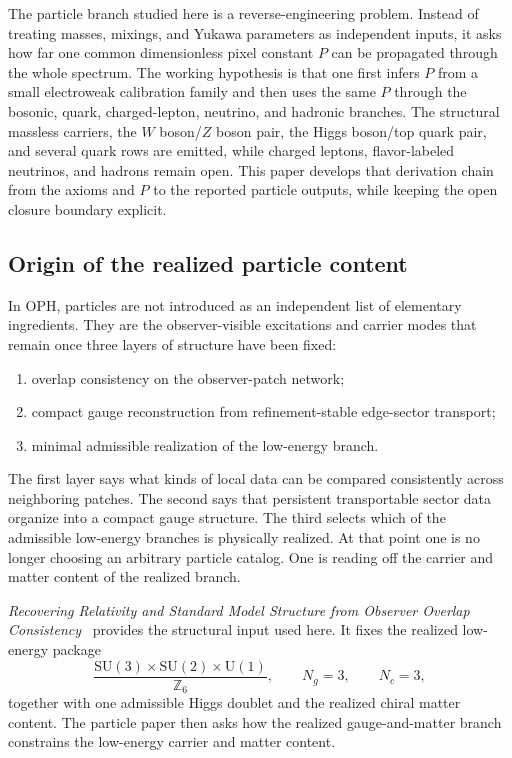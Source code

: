 \documentclass[11pt]{article}
\newcommand{\SU}{\mathrm{SU}}
\newcommand{\U}{\mathrm{U}}
\begin{document}
The particle branch studied here is a reverse-engineering problem. Instead of treating masses,
mixings, and Yukawa parameters as independent inputs, it asks how far one common dimensionless
pixel constant \(P\) can be propagated through the whole spectrum. The working hypothesis is that
one first infers \(P\) from a small electroweak calibration family and then uses the same \(P\)
through the bosonic, quark, charged-lepton, neutrino, and hadronic branches. The structural
massless carriers, the \(W\) boson/\(Z\) boson pair, the Higgs boson/top quark pair,
and several quark rows are emitted, while charged leptons, flavor-labeled neutrinos, and
hadrons remain open. This paper develops that derivation chain from the axioms and \(P\) to the
reported particle outputs, while keeping the open closure boundary explicit.

\subsection{Origin of the realized particle content}

In OPH, particles are not introduced as an independent list of elementary ingredients. They are
the observer-visible excitations and carrier modes that remain once three layers of structure have
been fixed:
\begin{enumerate}[leftmargin=2em]
\item overlap consistency on the observer-patch network;
\item compact gauge reconstruction from refinement-stable edge-sector transport;
\item minimal admissible realization of the low-energy branch.
\end{enumerate}
The first layer says what kinds of local data can be compared consistently across neighboring
patches. The second says that persistent transportable sector data organize into a compact gauge
structure. The third selects which of the admissible low-energy branches is physically realized.
At that point one is no longer choosing an arbitrary particle catalog. One is reading off the
carrier and matter content of the realized branch.

\emph{Recovering Relativity and Standard Model Structure from Observer Overlap
Consistency}~\cite{ophcompact} provides the structural input used here. It fixes the realized
low-energy package
\[
\frac{\SU(3)\times\SU(2)\times\U(1)}{\mathbb Z_6},
\qquad
N_g=3,
\qquad
N_c=3,
\]
together with one admissible Higgs doublet and the realized chiral matter content. The particle
paper then asks how the realized gauge-and-matter branch constrains the low-energy carrier and
matter content.
\end{document}
